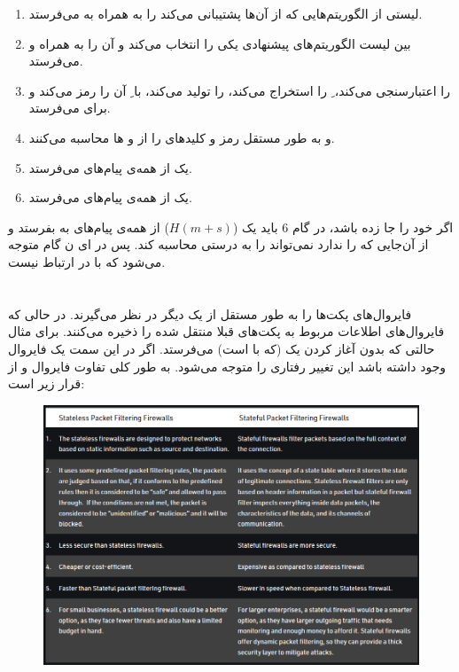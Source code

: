 \documentclass{article}
\begin{document}
\begin{enumerate}
	\item {} لیستی از الگوریتم‌هایی که از آن‌ها پشتیبانی می‌کند را به همراه  به  می‌فرستد.
	\item {} بین لیست الگوریتم‌های پیشنهادی یکی را انتخاب می‌کند و آن را به همراه  و  می‌فرستد.
	\item {}  را اعتبارسنجی می‌کند، ِ  را استخراج می‌کند،  را تولید می‌کند، با ِ  آن را رمز می‌کند و برای  می‌فرستد.
	\item {} و  به طور مستقل رمز و کلیدهای  را از  و ها محاسبه می‌کنند.
	\item {} یک  از همه‌ی پیام‌های  می‌فرستد.
	\item {} یک  از همه‌ی پیام‌های  می‌فرستد.
\end{enumerate}

اگر  خود را  جا زده باشد، در گام 6 باید یک  ($H(m+s)$) از همه‌ی پیام‌های  به  بفرستد و از آن‌جایی که  را ندارد نمی‌تواند  را به درستی محاسبه کند. پس  در ای ن گام متوجه می‌شود که با  در ارتباط نیست.

\section{}
فایروال‌های  پکت‌ها را به طور مستقل از یک دیگر در نظر می‌گیرند. در حالی که فایروال‌های  اطلاعات مربوط به پکت‌های قبلا منتقل شده را ذخیره می‌کنند. برای مثال حالتی که  بدون آغاز کردن یک  (که با  است)  می‌فرستد. اگر در این سمت یک فایروال  وجود داشته باشد این تغییر رفتاری را متوجه می‌شود. به طور کلی تفاوت فایروال  و  از قرار زیر است:
\begin{figure}[H]
    \centering
    \includegraphics[width=1\textwidth]{figures/2.png}
    \caption
	{}
    \label{fig:fig1}
\end{figure}
\end{document}
